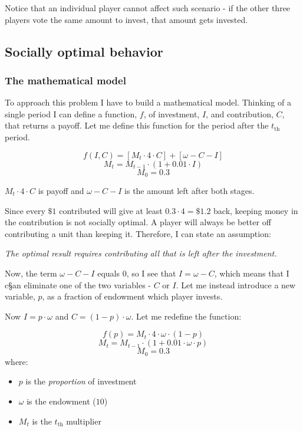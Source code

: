 			Notice that an individual player cannot affect such scenario - if the other three players vote the same amount to invest, that amount gets invested.

	\subsection{Socially optimal behavior}
	
		\subsubsection{The mathematical model}
	
			To approach this problem I have to build a mathematical model. Thinking of a single period I can define a function, $f$, of investment, $I$, and contribution, $C$, that returns a payoff. Let me define this function for the period after the $t_\text{th}$ period.
			
			\[
				f(I, C) = [M_t \cdot 4 \cdot C] + [\omega - C - I]
			\]
			\[
				M_t = M_{t-1} \cdot (1 + 0.01 \cdot I)
			\]
			\[
				M_0 = 0.3
			\]

			$M_t \cdot 4 \cdot C$ is payoff and $\omega - C - I$ is the amount left after both stages.
			
			Since every $\$1$ contributed will give at least $0.3 \cdot 4 = \$1.2$ back, keeping money in the contribution is not socially optimal. A player will always be better off contributing a unit than keeping it. Therefore, I can state an assumption:
			
			\begin{displayquote}
				\emph{
					The optimal result requires contributing all that is left after the investment.
				} 
			\end{displayquote} 
		
			Now, the term $\omega - C - I$ equals $0$, so I see that $I = \omega - C$, which means that I c§an eliminate one of the two variables - $C$ or $I$.	Let me instead introduce a new variable, $p$, as a fraction of endowment which player invests.

			Now $I = p \cdot \omega$ and $C = (1-p) \cdot \omega$. Let me redefine the function:
			
			\[
				f(p) = M_t \cdot 4 \cdot \omega \cdot (1 - p)
			\]
			\[
				M_t = M_{t-1} \cdot (1 + 0.01 \cdot \omega \cdot p)
			\]
			\[
				M_0 = 0.3
			\]
			where:
			\begin{itemize}
				\item
					$p$ is the \emph{proportion} of investment
				\item 
					$\omega$ is the endowment ($10$)
				\item
					$M_t$ is the $t_\text{th}$ multiplier
			\end{itemize}
		
